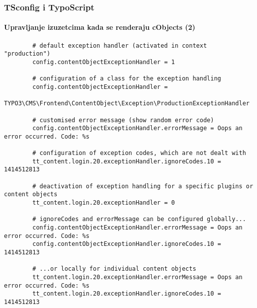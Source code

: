 \begin{frame}[fragile]
	\frametitle{TSconfig i TypoScript}
	\framesubtitle{Upravljanje izuzetcima kada se renderaju cObjects (2)}
	
	\lstset{
		basicstyle=\tiny\ttfamily
	}
	
	\begin{lstlisting}
		# default exception handler (activated in context "production")
		config.contentObjectExceptionHandler = 1

		# configuration of a class for the exception handling
		config.contentObjectExceptionHandler =
		  TYPO3\CMS\Frontend\ContentObject\Exception\ProductionExceptionHandler

		# customised error message (show random error code)
		config.contentObjectExceptionHandler.errorMessage = Oops an error occurred. Code: %s

		# configuration of exception codes, which are not dealt with
		tt_content.login.20.exceptionHandler.ignoreCodes.10 = 1414512813

		# deactivation of exception handling for a specific plugins or content objects
		tt_content.login.20.exceptionHandler = 0

		# ignoreCodes and errorMessage can be configured globally...
		config.contentObjectExceptionHandler.errorMessage = Oops an error occurred. Code: %s
		config.contentObjectExceptionHandler.ignoreCodes.10 = 1414512813

		# ...or locally for individual content objects
		tt_content.login.20.exceptionHandler.errorMessage = Oops an error occurred. Code: %s
		tt_content.login.20.exceptionHandler.ignoreCodes.10 = 1414512813
	\end{lstlisting}

\end{frame}


